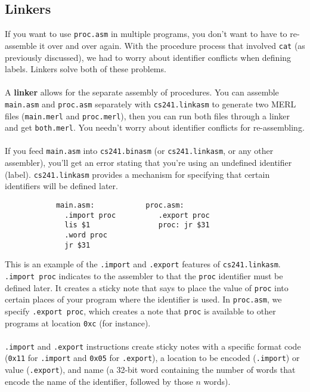 \documentclass[]{article}
\theoremstyle{definition}
\begin{document}
		\subsection{Linkers}
			If you want to use \verb+proc.asm+ in multiple programs, you don't want to have to re-assemble it over and over again. With the procedure process that involved \verb+cat+ (as previously discussed), we had to worry about identifier conflicts when defining labels. Linkers solve both of these problems.
			\\ \\
			A \textbf{linker} allows for the separate assembly of procedures. You can assemble \verb+main.asm+ and \verb+proc.asm+ separately with \verb+cs241.linkasm+ to generate two MERL files (\verb+main.merl+ and \verb+proc.merl+), then you can run both files through a linker and get \verb+both.merl+. You needn't worry about identifier conflicts for re-assembling.
			\\ \\
			If you feed \verb+main.asm+ into \verb+cs241.binasm+ (or \verb+cs241.linkasm+, or any other assembler), you'll get an error stating that you're using an undefined identifier (label). \verb+cs241.linkasm+ provides a mechanism for specifying that certain identifiers will be defined later. 
			\begin{verbatim}
			main.asm:            proc.asm:
			  .import proc          .export proc
			  lis $1                proc: jr $31
			  .word proc
			  jr $31
			\end{verbatim}
			This is an example of the \verb+.import+ and \verb+.export+ features of \verb+cs241.linkasm+. \verb+.import proc+ indicates to the assembler to that the \verb+proc+ identifier must be defined later. It creates a sticky note that says to place the value of \verb+proc+ into certain places of your program where the identifier is used. In \verb+proc.asm+, we specify \verb+.export proc+, which creates a note that \verb+proc+ is available to other programs at location \verb+0xc+ (for instance).
			\\ \\
			\verb+.import+ and \verb+.export+ instructions create sticky notes with a specific format code (\verb+0x11+ for \verb+.import+ and \verb+0x05+ for \verb+.export+), a location to be encoded (\verb+.import+) or value (\verb+.export+), and name (a 32-bit word containing the number of words that encode the name of the identifier, followed by those $n$ words).
			\\ \\
\end{document}
